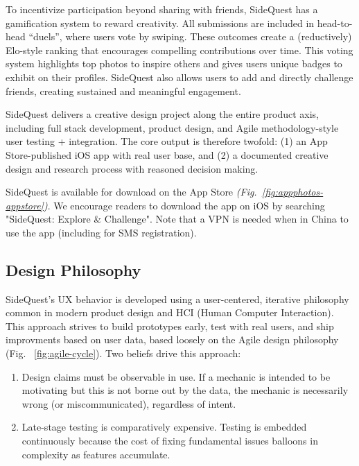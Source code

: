 \documentclass[12pt]{article}
\begin{document}
To incentivize participation beyond sharing with friends, SideQuest has a gamification system to reward creativity. All submissions are included in head-to-head ``duels'', where users vote by swiping. These outcomes create a (reductively) Elo-style ranking that encourages compelling contributions over time. This voting system highlights top photos to inspire others and gives users unique badges to exhibit on their profiles. SideQuest also allows users to add and directly challenge friends, creating sustained and meaningful engagement.

SideQuest delivers a creative design project along the entire product axis, including full stack development, product design, and Agile methodology-style user testing + integration. The core output is therefore twofold: (1) an App Store-published iOS app with real user base, and (2) a documented creative design and research process with reasoned decision making.

SideQuest is available for download on the App Store \textit{(Fig.~\ref{fig:appphotos-appstore})}. We encourage readers to download the app on iOS by searching "SideQuest: Explore \& Challenge". Note that a VPN is needed when in China to use the app (including for SMS registration).



\subsection{Design Philosophy}

SideQuest's UX behavior is developed using a user-centered, iterative philosophy common in modern product design and HCI (Human Computer Interaction). This approach strives to build prototypes early, test with real users, and ship improvments based on user data, based loosely on the Agile design philosophy (Fig. ~\ref{fig:agile-cycle}). Two beliefs drive this approach:

\begin{enumerate}[leftmargin=*, itemsep=0.4\baselineskip]
  \item Design claims must be observable in use. If a mechanic is intended to be motivating but this is not borne out by the data, the mechanic is necessarily wrong (or miscommunicated), regardless of intent.
  \item Late-stage testing is comparatively expensive. Testing is embedded continuously because the cost of fixing fundamental issues balloons in complexity as features accumulate.
\end{enumerate}
\end{document}

